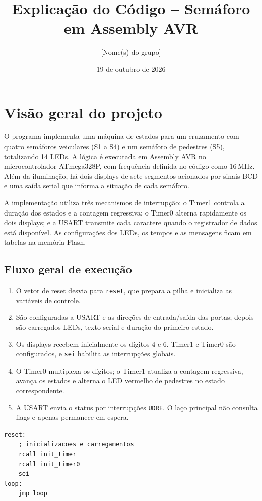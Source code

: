 \documentclass[12pt,a4paper]{article}
\title{Explicação do Código -- Semáforo em Assembly AVR}
\author{[Nome(s) do grupo]}
\date{19 de outubro de 2026}
\newcommand{\reg}[1]{\texttt{#1}}
\newcommand{\subrot}[1]{\texttt{#1}}
\begin{document}
\maketitle
\tableofcontents
\newpage

\section{Visão geral do projeto}
O programa implementa uma máquina de estados para um cruzamento com quatro semáforos veiculares (S1 a S4) e um semáforo de pedestres (S5), totalizando 14 LEDs. A lógica é executada em Assembly AVR no microcontrolador ATmega328P, com frequência definida no código como \(16\,\mathrm{MHz}\). Além da iluminação, há dois displays de sete segmentos acionados por sinais BCD e uma saída serial que informa a situação de cada semáforo.

A implementação utiliza três mecanismos de interrupção: o Timer1 controla a duração dos estados e a contagem regressiva; o Timer0 alterna rapidamente os dois displays; e a USART transmite cada caractere quando o registrador de dados está disponível. As configurações dos LEDs, os tempos e as mensagens ficam em tabelas na memória Flash.

\subsection{Fluxo geral de execução}
\begin{enumerate}
\item O vetor de reset desvia para \subrot{reset}, que prepara a pilha e inicializa as variáveis de controle.
\item São configuradas a USART e as direções de entrada/saída das portas; depois são carregados LEDs, texto serial e duração do primeiro estado.
\item Os displays recebem inicialmente os dígitos 4 e 6. Timer1 e Timer0 são configurados, e \reg{sei} habilita as interrupções globais.
\item O Timer0 multiplexa os dígitos; o Timer1 atualiza a contagem regressiva, avança os estados e alterna o LED vermelho de pedestres no estado correspondente.
\item A USART envia o status por interrupções \reg{UDRE}. O laço principal não consulta flags e apenas permanece em espera.
\end{enumerate}
\begin{lstlisting}
reset:
    ; inicializacoes e carregamentos
    rcall init_timer
    rcall init_timer0
    sei
loop:
    jmp loop
\end{lstlisting}
\end{document}
